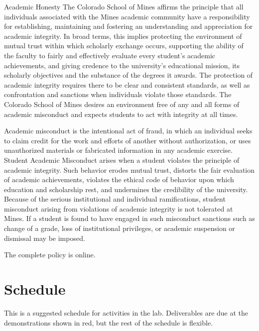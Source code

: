 \begin{frame}{Academic Honesty}
The Colorado School of Mines affirms the principle that all individuals associated with the Mines academic community have a responsibility for establishing, maintaining and fostering an understanding and appreciation for academic integrity. In broad terms, this implies protecting the environment of mutual trust within which scholarly exchange occurs, supporting the ability of the faculty to fairly and effectively evaluate every student's academic achievements, and giving credence to the university's educational mission, its scholarly objectives and the substance of the degrees it awards. The protection of academic integrity requires there to be clear and consistent standards, as well as confrontation and sanctions when individuals violate those standards. The Colorado School of Mines desires an environment free of any and all forms of academic misconduct and expects students to act with integrity at all times.  

Academic misconduct is the intentional act of fraud, in which an individual seeks to claim credit for the work and efforts of another without authorization, or uses unauthorized materials or fabricated information in any academic exercise. Student Academic Misconduct arises when a student violates the principle of academic integrity. Such behavior erodes mutual trust, distorts the fair evaluation of academic achievements, violates the ethical code of behavior upon which education and scholarship rest, and undermines the credibility of the university. Because of the serious institutional and individual ramifications, student misconduct arising from violations of academic integrity is not tolerated at Mines. If a student is found to have engaged in such misconduct sanctions such as change of a grade, loss of institutional privileges, or academic suspension or dismissal may be imposed.

The complete policy is online.
\end{frame}

\newpage
\section{Schedule} 

This is a suggested schedule for activities in the lab. Deliverables are due at the demonstrations shown in red, but the rest of the schedule is flexible.

\newcommand{\sd}{%
\ifcase\thedatedayname \or 
Mon\or Tue\or Wed\or Thu\or 
Fri\or Sat\or Sun\fi 
}%

